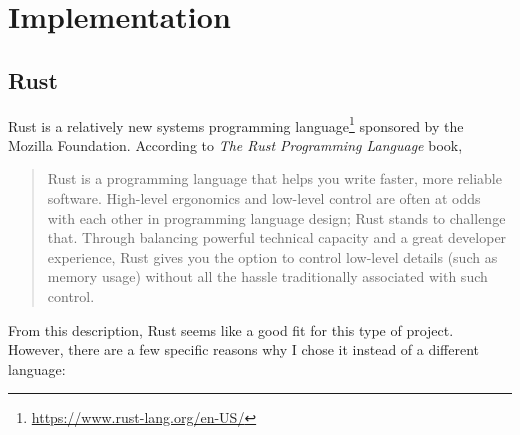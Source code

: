\section{Implementation} \label{implementation}

\subsection{Rust}

Rust is a relatively new systems programming language\footnote{\url{https://www.rust-lang.org/en-US/}} sponsored by the Mozilla Foundation. According to \emph{The Rust Programming Language} book\cite{trpl},

\begin{quote}
Rust is a programming language that helps you write faster, more reliable software. High-level ergonomics and low-level control are often at odds with each other in programming language design; Rust stands to challenge that. Through balancing powerful technical capacity and a great developer experience, Rust gives you the option to control low-level details (such as memory usage) without all the hassle traditionally associated with such control.
\end{quote}

From this description, Rust seems like a good fit for this type of project. However, there are a few specific reasons why I chose it instead of a different language:

